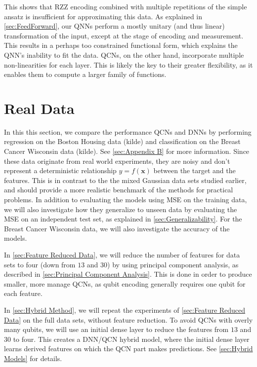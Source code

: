 This shows that RZZ encoding combined with multiple repetitions of the simple ansatz is insufficient for approximating this data. As explained in \autoref{sec:FeedForward}, our QNNs perform a mostly unitary (and thus linear) transformation of the input, except at the stage of encoding and measurement. This results in a perhaps too constrained functional form, which explains the QNN's inability to fit the data. QCNs, on the other hand, incorporate multiple non-linearities for each layer. This is likely the key to their greater flexibility, as it enables them to compute a larger family of functions. 



\section{Real Data}\label{sec:Real Data}
In this this section, we compare the performance QCNs and DNNs by performing regression on the Boston Housing data (kilde) and classification on the Breast Cancer Wisconsin data (kilde). See \autoref{sec:Appendix B} for more information. Since these data originate from real world experiments, they are noisy and don't represent a deterministic relationship $y = f(\boldsymbol{x})$ between the target and the features. This is in contrast to the the mixed Gaussian data sets studied earlier, and should provide a more realistic benchmark of the methods for practical problems. In addition to evaluating the models using MSE on the training data, we will also investigate how they generalize to unseen data by evaluating the MSE on an independent test set, as explained in \autoref{sec:Generalizability}. For the Breast Cancer Wisconsin data, we will also investigate the accuracy of the models. 

In \autoref{sec:Feature Reduced Data}, we will reduce the number of features for data sets to four (down from $13$ and $30$) by using principal component analysis, as described in \autoref{sec:Principal Component Analysis}. This is done in order to produce smaller, more manage QCNs, as qubit encoding generally requires one qubit for each feature. 

In \autoref{sec:Hybrid Method}, we will repeat the experiments of \autoref{sec:Feature Reduced Data} on the full data sets, without feature reduction. To avoid QCNs with overly many qubits, we will use an initial dense layer to reduce the features from $13$ and $30$ to four. This creates a DNN/QCN hybrid model, where the initial dense layer learns derived features on which the QCN part makes predictions. See \autoref{sec:Hybrid Models} for details. 

